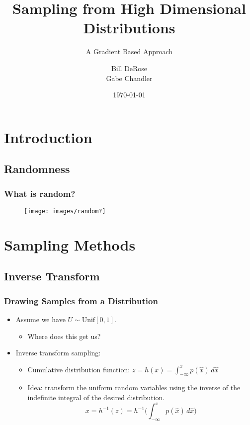\documentclass{beamer}
\title{Sampling from High Dimensional Distributions}
\subtitle{A Gradient Based Approach}
\author{Bill DeRose \\ Gabe Chandler}
\date{\today}
\begin{document}
\frame{\titlepage}

\section[Outline]{}
\frame{\tableofcontents}

\section{Introduction}
\subsection{Randomness}
\frame
{
  \frametitle{What is random?}
  \begin{figure}[!htbp]
   	\centering
   		\texttt{[image: images/random?]} 
  	 \label{fig:example}
   \end{figure}
}
\section{Sampling Methods}
\subsection{Inverse Transform}
\frame
{
  \frametitle{Drawing Samples from a Distribution}
	\begin{itemize}
		\item Assume we have $U \sim \mbox{Unif}[0, 1]$.
		\begin{itemize}
			\item Where does this get us?
		\end{itemize}
		\pause
		\item Inverse transform sampling:
		\begin{itemize}
		\item Cumulative distribution function: $z = h(x) = \int_{-\infty}^x p(\hat{x}) \,d\hat{x}$
		\item Idea: transform the uniform random variables using the inverse of the 
		indefinite integral of the desired distribution. 
		$$x = h^{-1}(z) = h^{-1}\bigg( \int_{-\infty}^x p(\hat{x}) \,d\hat{x}\bigg)$$
		\end{itemize} 
	\end{itemize}
}
\end{document}
